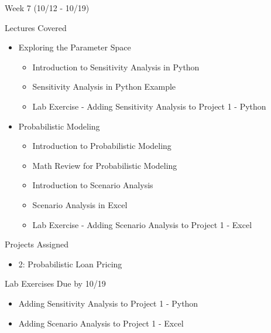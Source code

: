 \documentclass[]{article}
\begin{document}
\begin{section}{Week 7 (10/12 - 10/19)}
\begin{subsection}{Lectures Covered}
\begin{itemize}
\item Exploring the Parameter Space
\begin{itemize}
\item Introduction to Sensitivity Analysis in Python
\item Sensitivity Analysis in Python Example
\item Lab Exercise - Adding Sensitivity Analysis to Project 1 - Python
\end{itemize}
\end{itemize}
\begin{itemize}
\item Probabilistic Modeling
\begin{itemize}
\item Introduction to Probabilistic Modeling
\item Math Review for Probabilistic Modeling
\item Introduction to Scenario Analysis
\item Scenario Analysis in Excel
\item Lab Exercise - Adding Scenario Analysis to Project 1 - Excel
\end{itemize}
\end{itemize}
\end{subsection}
\begin{subsection}{Projects Assigned}
\begin{itemize}
\item 2: Probabilistic Loan Pricing
\end{itemize}
\end{subsection}
\begin{subsection}{Lab Exercises Due by 10/19}
\begin{itemize}
\item Adding Sensitivity Analysis to Project 1 - Python
\item Adding Scenario Analysis to Project 1 - Excel
\end{itemize}
\end{subsection}
\end{section}
\end{document}
